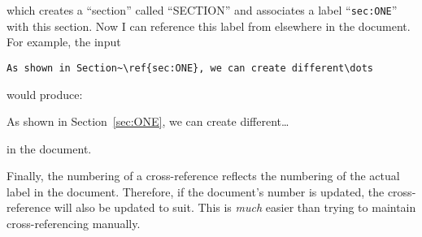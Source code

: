 \noindent which creates a ``section'' called ``SECTION'' and
associates a label ``\verb|sec:ONE|'' with this section.  Now I can
reference this label from elsewhere in the document.  For example, the
input

\begin{center}
\begin{verbatim}
As shown in Section~\ref{sec:ONE}, we can create different\dots
\end{verbatim}
\end{center}

\noindent would produce:

\begin{center}
As shown in Section~\ref{sec:ONE}, we can create different\dots
\end{center}

\noindent in the document.

Finally, the numbering of a cross-reference reflects the numbering
of the actual label in the document.  Therefore, if the document's
number is updated, the cross-reference will also be updated to
suit.  This is \emph{much} easier than trying to maintain
cross-referencing manually.
